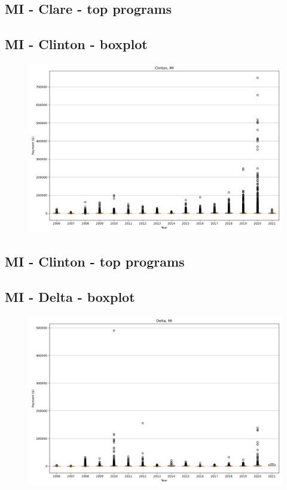 \subsection*{MI - Clare - top programs}

\newpage
\subsection*{MI - Clinton - boxplot}
\begin{figure}[h]
\centering
\includegraphics[width=7in]{../output/boxplots/counties/Clinton-MI_boxplot.png}
\end{figure}


\subsection*{MI - Clinton - top programs}

\newpage
\subsection*{MI - Delta - boxplot}
\begin{figure}[h]
\centering
\includegraphics[width=7in]{../output/boxplots/counties/Delta-MI_boxplot.png}
\end{figure}


